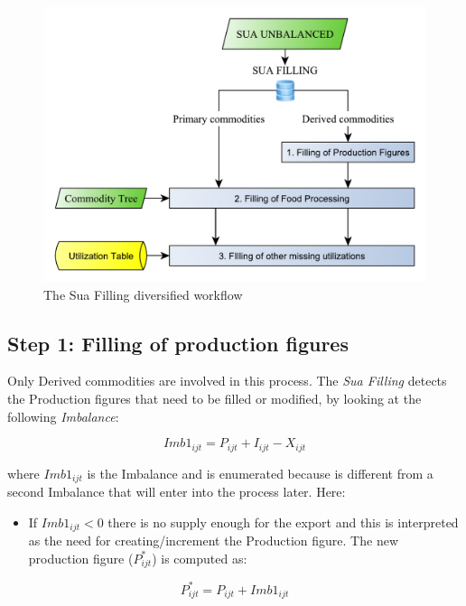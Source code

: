 \documentclass[]{article}
\providecommand{\tightlist}{%
  \setlength{\itemsep}{0pt}\setlength{\parskip}{0pt}}
\begin{document}
\begin{figure}[h]

{\centering \includegraphics[width=0.65\linewidth]{images/StandBal/04b_SuaFilling2} 

}

\caption{\label{fig:f4}The Sua Filling diversified workflow}\label{fig:f4}
\end{figure}

\subsection*{Step 1: Filling of production
figures}\label{step-1-filling-of-production-figures}

Only Derived commodities are involved in this process. The \emph{Sua
Filling} detects the Production figures that need to be filled or
modified, by looking at the following \emph{Imbalance}:

\begin{equation}
\label{eq:imbalance1}
Imb1_{ijt} = P_{ijt} + I_{ijt} - X_{ijt}
\end{equation}

where \(Imb1_{ijt}\) is the Imbalance and is enumerated because is
different from a second Imbalance that will enter into the process
later. Here:

\begin{itemize}
\tightlist
\item
  If \(Imb1_{ijt} < 0\) there is no supply enough for the export and
  this is interpreted as the need for creating/increment the Production
  figure. The new production figure (\(P^*_{ijt}\)) is computed as:
\end{itemize}

\begin{equation}
\label{eq:imbalance1}
 P^*_{ijt} = P_{ijt} + Imb1_{ijt}
\end{equation}
\end{document}
